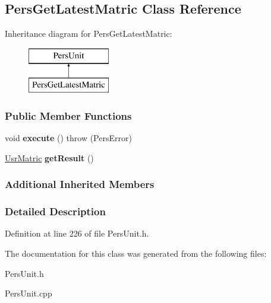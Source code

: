 \hypertarget{classPersGetLatestMatric}{\subsection{Pers\-Get\-Latest\-Matric Class Reference}
\label{de/d05/classPersGetLatestMatric}
}
Inheritance diagram for Pers\-Get\-Latest\-Matric\-:\begin{figure}[H]
\begin{center}
\leavevmode
\includegraphics[height=2.000000cm]{de/d05/classPersGetLatestMatric}
\end{center}
\end{figure}
\subsubsection*{Public Member Functions}
\begin{DoxyCompactItemize}
\item 
\hypertarget{classPersGetLatestMatric_aef898ecbe507a95af50cd77dbb48620e}{void {\bfseries execute} ()  throw (\-Pers\-Error)}\label{de/d05/classPersGetLatestMatric_aef898ecbe507a95af50cd77dbb48620e}

\item 
\hypertarget{classPersGetLatestMatric_a844da85c128a46ddfb8727965b9a3a87}{\hyperlink{classUsrMatric}{Usr\-Matric} {\bfseries get\-Result} ()}\label{de/d05/classPersGetLatestMatric_a844da85c128a46ddfb8727965b9a3a87}

\end{DoxyCompactItemize}
\subsubsection*{Additional Inherited Members}


\subsubsection{Detailed Description}


Definition at line 226 of file Pers\-Unit.\-h.



The documentation for this class was generated from the following files\-:\begin{DoxyCompactItemize}
\item 
Pers\-Unit.\-h\item 
Pers\-Unit.\-cpp\end{DoxyCompactItemize}
